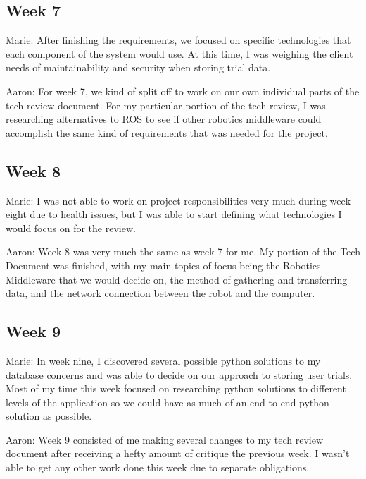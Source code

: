 \documentclass[onecolumn, draftclsnofoot,10pt, compsoc]{IEEEtran}
\begin{document}
\subsection{Week 7}
Marie: After finishing the requirements, we focused on specific technologies that each component of the system would use. At this time, I was weighing the client needs of maintainability and security when storing trial data.\par

Aaron: For week 7, we kind of split off to work on our own individual parts of the tech review document. For my particular portion of the tech review, I was researching alternatives to ROS to see if other robotics middleware could accomplish the same kind of requirements that was needed for the project.\par

\subsection{Week 8}
Marie: I was not able to work on project responsibilities very much during week eight due to health issues, but I was able to start defining what technologies I would focus on for the review.\par

Aaron: Week 8 was very much the same as week 7 for me. My portion of the Tech Document was finished, with my main topics of focus being the Robotics Middleware that we would decide on, the method of gathering and transferring data, and the network connection between the robot and the computer.\par

\subsection{Week 9}
Marie: In week nine, I discovered several possible python solutions to my database concerns and was able to decide on our approach to storing user trials. Most of my time this week focused on researching python solutions to different levels of the application so we could have as much of an end-to-end python solution as possible.\par

Aaron: Week 9 consisted of me making several changes to my tech review document after receiving a hefty amount of critique the previous week. I wasn't able to get any other work done this week due to separate obligations.\par
\end{document}
